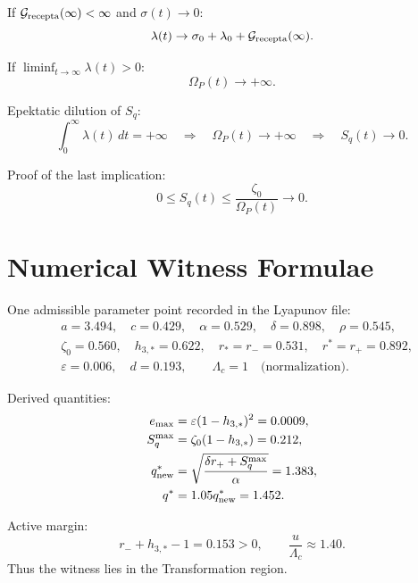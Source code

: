 \documentclass[11pt,a4paper]{article}
\newcommand{\Grec}{\mathcal G_{\rm recepta}}
\newcommand{\Sq}{S_q}
\newcommand{\Om}{\Omega_P}
\theoremstyle{plain}
\theoremstyle{definition}
\theoremstyle{remark}
\begin{document}
If $\Grec(\infty)<\infty$ and $\sigma(t)\to0$:
\begin{equation}
  \lambda(t)\to \sigma_0+\lambda_0+\Grec(\infty).
\end{equation}

If $\liminf_{t\to\infty}\lambda(t)>0$:
\begin{equation}
  \Om(t)\to+\infty.
\end{equation}

Epektatic dilution of $S_q$:
\begin{equation}
  \int_0^\infty\lambda(t)\,dt=+\infty
  \quad\Longrightarrow\quad
  \Om(t)\to+\infty
  \quad\Longrightarrow\quad
  S_q(t)\to0.
\end{equation}

Proof of the last implication:
\begin{equation}
  0\le S_q(t)\le\frac{\zeta_0}{\Om(t)}\to0.
\end{equation}


\section{Numerical Witness Formulae}\label{sec:witness}

One admissible parameter point recorded in the Lyapunov file:
\begin{equation}
\begin{aligned}
&a=3.494,\quad c=0.429,\quad \alpha=0.529,\quad \delta=0.898,\quad \rho=0.545,\\
&\zeta_0=0.560,\quad h_{3,*}=0.622,\quad r_*=r_-=0.531,\quad r^*=r_+=0.892,\\
&\varepsilon=0.006,\quad d=0.193,\qquad \Lambda_c=1\quad\text{(normalization)}.
\end{aligned}
\end{equation}

Derived quantities:
\begin{equation}
\begin{aligned}
  e_{\max}&=\varepsilon(1-h_{3,*})^2=0.0009,\\
  \Sq^{\max}&=\zeta_0(1-h_{3,*})=0.212,\\
  q_{\rm new}^*&=\sqrt{\frac{\delta r_++\Sq^{\max}}{\alpha}}=1.383,\\
  q^*&=1.05q_{\rm new}^*=1.452.
\end{aligned}
\end{equation}

Active margin:
\begin{equation}
  r_-+h_{3,*}-1=0.153>0,
  \qquad
  \frac{u}{\Lambda_c}\approx1.40.
\end{equation}
Thus the witness lies in the Transformation region.
\end{document}
